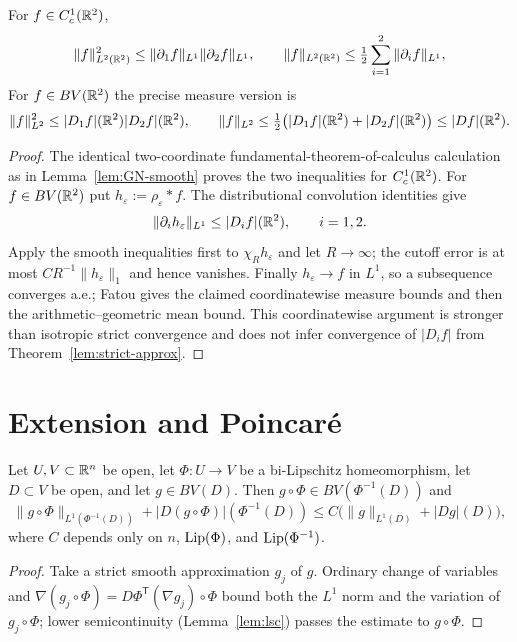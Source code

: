 \begin{lemma}\label{lem:planar-sobolev-L2}
For $f\in C^1_c(\mathbb R^2)$,
\begin{equation}\label{eq:planar-sobolev-L2}
  \|f\|_{L^2(\mathbb R^2)}^2\le\|\partial_1f\|_{L^1}\|\partial_2f\|_{L^1},
  \qquad
  \|f\|_{L^2(\mathbb R^2)}\le\tfrac12\sum_{i=1}^2\|\partial_if\|_{L^1},
\end{equation}
For $f\in BV(\mathbb R^2)$ the precise measure version is
\[
  \|f\|_{L^2}^2\le |D_1f|(\mathbb R^2)|D_2f|(\mathbb R^2),\qquad
  \|f\|_{L^2}\le\tfrac12\bigl(|D_1f|(\mathbb R^2)+|D_2f|(\mathbb R^2)\bigr)
  \le |Df|(\mathbb R^2).
\]
\end{lemma}

\begin{proof}
The identical two-coordinate fundamental-theorem-of-calculus calculation as
in Lemma~\ref{lem:GN-smooth} proves the two inequalities for
$C^1_c(\mathbb R^2)$.  For $f\in BV(\mathbb R^2)$ put $h_\varepsilon:=\rho_\varepsilon*f$.
The distributional convolution identities give
\[
  \|\partial_i h_\varepsilon\|_{L^1}
  \le |D_if|(\mathbb R^2),\qquad i=1,2.
\]
Apply the smooth inequalities first to $\chi_Rh_\varepsilon$ and let
$R\to\infty$; the cutoff error is at most
$C R^{-1}\|h_\varepsilon\|_1$ and hence vanishes.  Finally
$h_\varepsilon\to f$ in $L^1$, so a subsequence converges a.e.; Fatou gives
the claimed coordinatewise measure bounds and then the arithmetic--geometric
mean bound.  This coordinatewise argument is stronger than isotropic strict
convergence and does not infer convergence of $|D_if|$ from
Theorem~\ref{lem:strict-approx}.
\end{proof}

\section{Extension and Poincar\'e}

\begin{lemma}\label{lem:bilip-chain}
Let $U,V\subset\mathbb R^n$ be open, let $\Phi:U\to V$ be a bi-Lipschitz
homeomorphism, let $D\subset V$ be open, and let $g\in BV(D)$.  Then
$g\circ\Phi\in BV(\Phi^{-1}(D))$ and
\[
 \|g\circ\Phi\|_{L^1(\Phi^{-1}(D))}
 +|D(g\circ\Phi)|(\Phi^{-1}(D))
 \le C\bigl(\|g\|_{L^1(D)}+|Dg|(D)\bigr),
\]
where $C$ depends only on $n$, $\operatorname{Lip}(\Phi)$, and $\operatorname{Lip}(\Phi^{-1})$.
\end{lemma}

\begin{proof}
Take a strict smooth approximation $g_j$ of $g$.  Ordinary change of
variables and
$\nabla(g_j\circ\Phi)=D\Phi^{\mathsf T}(\nabla g_j)\circ\Phi$ bound both the
$L^1$ norm and the variation of $g_j\circ\Phi$; lower semicontinuity
(Lemma~\ref{lem:lsc}) passes the estimate to $g\circ\Phi$.
\end{proof}

